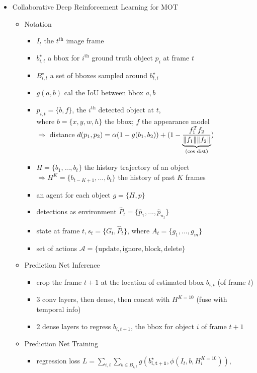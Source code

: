 \begin{itemize}
\item Collaborative Deep Reinforcement Learning for MOT
	\begin{itemize}
	\item Notation
		\begin{itemize}
		\item $I_t$ the $t^\text{th}$ image frame
		\item $b^\star_{i,t}$ a bbox for $i^\text{th}$ ground truth object $p_i$ at frame $t$
		\item $B^\star_{i,t}$ a set of bboxes sampled around $b^\star_{t,i}$
		\item $g(a,b)$ cal the IoU between bbox $a,b$
		\item $p_{i,t} = \{ b,f \}$, the $i^\text{th}$ detected object at $t$, \\
		where $b=\{x,y,w,h\}$ the bbox; $f$ the appearance model \\
		$\Rightarrow$ distance $d(p_1,p_2) = \alpha (1-g(b_1,b_2)) + (1- \underbrace{\frac{f_1^Tf_2}{\lVert f_1\rVert\lVert f_2\rVert}}_\text{(cos dist)})$
		\item $H=\{ b_1, ..., b_t \}$ the history trajectory of an object \\
		$\Rightarrow H^K = \{b_{t-K+1}, ..., b_t\}$ the history of past $K$ frames
		\item an agent for each object $g = \{ H, p \}$
		\item detections as environment $\hat P_t = \{\hat p_1,...,\hat p_{n_t}\}$
		\item state at frame $t, s_t=\{G_t, \hat P_t \}$, where $A_t = \{ g_1,...,g_m \}$
		\item set of actions $\mathcal A=\{\text{update}, \text{ignore}, \text{block}, \text{delete} \}$
		\end{itemize}
	\item Prediction Net Inference
		\begin{itemize}
		\item crop the frame $t+1$ at the location of estimated bbox $b_{i,t}$ (of frame $t$)
		\item 3 conv layers, then dense, then concat with $H^{K=10}$ (fuse with temporal info)
		\item 2 dense layers to regress $b_{i,t+1}$, the bbox for object $i$ of frame $t+1$
		\end{itemize}
	\item Prediction Net Training
		\begin{itemize}
		\item regression loss $\displaystyle L = \sum_{i,t}\sum_{b\in B_{i,t}} g ( b^\star_{i,\mathbf{t+1}}, \phi(I_t, b, H^{K=10}_i))$, \\

\end{itemize}
\end{itemize}
\end{itemize}
